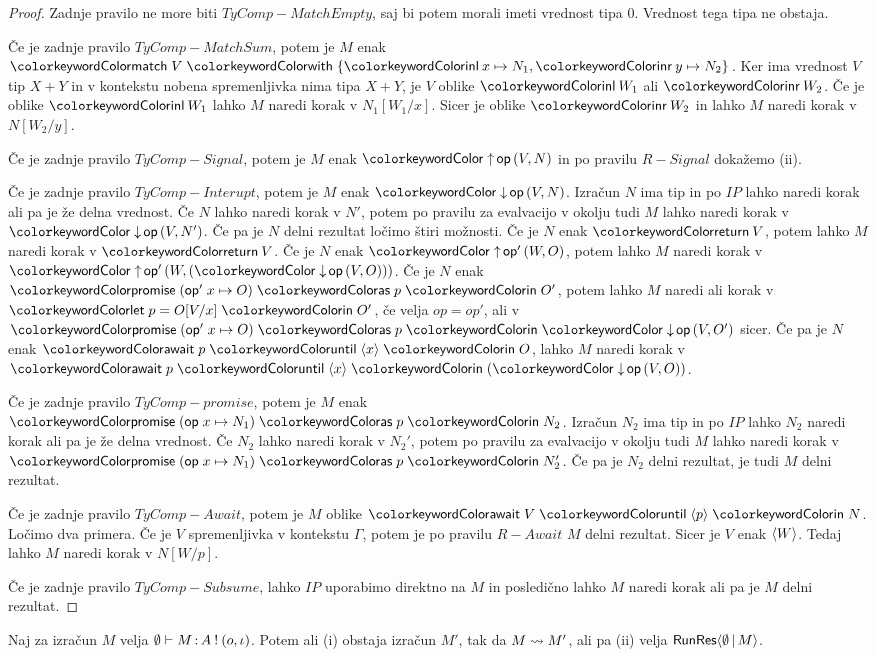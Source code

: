 \begin{proof}
	Zadnje pravilo ne more biti $TyComp-MatchEmpty$, saj bi potem morali imeti vrednost tipa $0$. Vrednost tega tipa ne obstaja.
	
	Če je zadnje pravilo $TyComp-MatchSum$, potem je $M$ enak $\tmmatch{V}{\tminl{x} \mapsto N_1, \tminr{y} \mapsto N_2}$.
	Ker ima vrednost $V$ tip $X + Y$ in v kontekstu nobena spremenljivka nima tipa $X + Y$, je $V$ oblike $\tminl{W_1}$ ali $\tminr{W_2}$.
	Če je oblike $\tminl{W_1}$ lahko $M$ naredi korak v $N_1[W_1/x]$.
	Sicer je oblike $\tminr{W_2}$ in lahko $M$ naredi korak v $N[W_2/y]$.
	
	Če je zadnje pravilo $TyComp-Signal$, potem je $M$ enak $\tmopout{op}{V}{N}$ in po pravilu $R-Signal$ dokažemo (ii).
	
	Če je zadnje pravilo $TyComp-Interupt$, potem je $M$ enak $\tmopin{op}{V}{N}$. Izračun $N$ ima tip in po $IP$ lahko naredi korak ali pa je že delna vrednost. Če $N$ lahko naredi korak v $N'$, potem po pravilu za evalvacijo v okolju tudi $M$ lahko naredi korak v $\tmopin{op}{V}{N'}$. 
	Če pa je $N$ delni rezultat ločimo štiri možnosti.
	Če je $N$ enak $\tmreturn{V}$, potem lahko $M$ naredi korak v $\tmreturn{V}$.
	Če je $N$ enak $\tmopout{op'}{W}{O}$, potem lahko $M$ naredi korak v $\tmopout{op'}{W}{(\tmopin{op}{V}{O})}$.
	Če je $N$ enak $\tmwith{op'}{x}{O}{p}{O'}$, potem lahko $M$ naredi ali korak v $\tmlet{p}{O[V/x]}{O'}$, če velja $op = op'$, ali v $\tmwith{op'}{x}{O}{p}{\tmopin{op}{V}{O'}}$ sicer.
	Če pa je $N$ enak $\tmawait{p}{x}{O}$, lahko $M$ naredi korak v $\tmawait{p}{x}{(\tmopin{op}{V}{O})}$.
	
	Če je zadnje pravilo $TyComp-promise$, potem je $M$ enak $\tmwith{op}{x}{N_1}{p}{N_2}$. Izračun $N_2$ ima tip in po $IP$ lahko $N_2$ naredi korak ali pa je že delna vrednost. Če $N_2$ lahko naredi korak v $N_2'$, potem po pravilu za evalvacijo v okolju tudi $M$ lahko naredi korak v $\tmwith{op}{x}{N_1}{p}{N_2'}$.
	Če pa je $N_2$ delni rezultat, je tudi $M$ delni rezultat.
	
	Če je zadnje pravilo $TyComp-Await$, potem je $M$ oblike $\tmawait{V}{p}{N}$.
	Ločimo dva primera.
	Če je $V$ spremenljivka v kontekstu $\Gamma$, potem je po pravilu $R-Await$ $M$ delni rezultat.
	Sicer je $V$ enak $\langle W \rangle$. Tedaj lahko $M$ naredi korak v $N[W/p]$.
	
	Če je zadnje pravilo $TyComp-Subsume$, lahko $IP$ uporabimo direktno na $M$ in posledično lahko $M$ naredi korak ali pa je $M$ delni rezultat.
\end{proof}


\begin{posledica}[o napredku]\label{pos:prazen-napredek}
	Naj za izračun $M$ velja $\emptyset \vdash M \mathinner{:} A \mathbin{!} (o, \iota)$. Potem ali (i) obstaja izračun $M'$, tak da $M \leadsto M'$, ali pa (ii) velja $\mathsf{RunRes}\langle\emptyset \,\vert\, M\rangle$.
\end{posledica}

